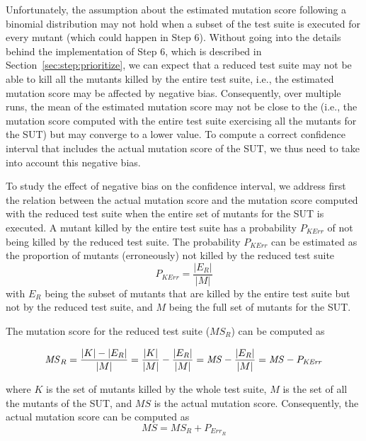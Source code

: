 Unfortunately, the assumption about the estimated mutation score following a binomial distribution may not hold when a subset of the test suite is executed for every mutant (which could happen in Step 6). Without going into the details behind the implementation of Step 6, which is described in Section~\ref{sec:step:prioritize}, 
we can expect that a reduced test suite may not be able to kill all the mutants killed by the entire test suite, i.e., the estimated mutation score may be affected by negative bias. Consequently, over multiple runs, the mean of the estimated mutation score may not be close to the  (i.e., the mutation score computed with the entire test suite exercising all the mutants for the SUT)
 but may converge to a lower value. 
To compute a correct confidence interval that includes the actual mutation score of the SUT, we thus need to take into account this negative bias.

To study the effect of negative bias on the confidence interval, we address first the relation between the actual mutation score and the mutation score computed with the reduced test suite when the entire set of mutants for the SUT is executed. 
A mutant killed by the entire test suite has a probability $P_{\mathit{KErr}}$ of not being killed by the reduced test suite.
The probability $P_{\mathit{KErr}}$  can be estimated as the proportion of mutants (erroneously) not killed by the reduced test suite 
\begin{equation}
P_{\mathit{KErr}} = \frac{|E_R|}{|M|}
\end{equation}
with 
$E_R$ being the subset of mutants that are killed by the entire test suite but not by the reduced test suite, and $M$ being the full set of mutants for the SUT.

The mutation score for the reduced test suite ($\mathit{MS}_R$) can be computed as

\begin{equation}
\small
\mathit{MS}_R=\frac{|K|-|E_R|}{|M|}=\frac{|K|}{|M|}-\frac{|E_R|}{|M|}=\mathit{MS}-\frac{|E_R|}{|M|}=\mathit{MS}-P_{\mathit{KErr}}
\end{equation}

where $K$ is the set of mutants killed by the whole test suite, $M$ is the set of all the mutants of the SUT,  and $\mathit{MS}$ is the actual mutation score. Consequently, the actual mutation score can be computed as 
\begin{equation}
\label{eq:MS}
\mathit{MS}=\mathit{MS}_R+P_{\mathit{Err}_R}
\end{equation}


